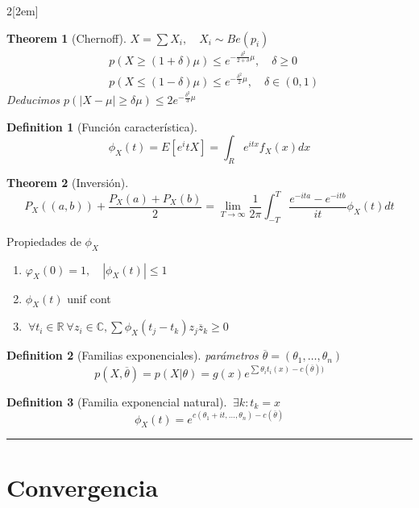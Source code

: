\documentclass[leqno]{article}
\newtheorem*{theorem}{Theorem}
\newtheorem*{definition}{Definition}
\begin{document}
\begin{multicols}{2}[\columnsep2em]
\begin{theorem}[Chernoff] $X=\sum X_i, \quad X_i \sim Be(p_i)$
\begin{align*}
  & p(X\ge (1+\delta)\mu) \le e^{- \frac{\delta^2}{2 + \delta}\mu}, \quad \delta\ge 0\\
  & p(X\le (1-\delta)\mu) \le e^{- \frac{\delta^2}{2 }\mu}, \quad \delta\in (0, 1)
\end{align*}
Deducimos $p(|X-\mu|\ge \delta\mu) \le 2e^{- \frac{\delta^2}{3}\mu}$
\end{theorem}

\begin{definition}[Función característica]
\[
\phi _X(t) = E[e^itX] = \int_{R} e^{itx}f_X(x)dx
\] 
\end{definition}

\begin{theorem}[Inversión]
 \[
P_X((a,b))+\frac{P_X(a) + P_X(b)}{2} = \lim_{T\to \infty } \frac{1}{2\pi} \int^T_{-T} \frac{e^{-ita}-e^{-itb}}{it} \phi_X(t)dt
\] 
\end{theorem}

Propiedades de $\phi_X$
\begin{enumerate}[topsep=-6pt, itemsep=0pt]
  \item $\varphi_X(0) = 1, \quad |\phi_X(t)|\le 1$ 
  \item $\phi _X(t)$ unif cont
  \item $\ \forall t_i\in \mathbb{R}\ \forall z_i\in \mathbb{C}, \sum \phi_X(t_j-t_k)z_j \overline{z}_k \ge 0$
\end{enumerate}

\begin{definition}[Familias exponenciales] parámetros $\overline{\theta }=(\theta _1, \ldots, \theta _n)$
\[
p(X, \overline{\theta }) = p(X|\theta ) = g(x)e^{\sum \theta_it_i(x) - c(\overline{\theta }))}
\] 
\end{definition}

\begin{definition}[Familia exponencial natural] $\ \exists k: t_k = x$ 
\[
\phi _X(t) = e^{c(\theta_1+it, \ldots, \theta _n)-c(\overline{\theta })}
\] 
\end{definition}
\hrule
\section{Convergencia}


\end{multicols}
\end{document}

